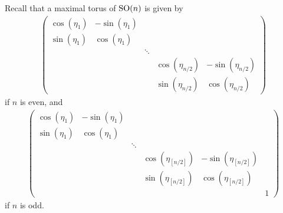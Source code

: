 \documentclass[pdftex]{sigma}
\numberwithin{equation}{section}
\begin{document}
Recall that a maximal torus of ${\rm SO}(n)$ is given by
\begin{gather*}
 \left(
\begin{matrix}
\cos(\eta_1) & -\sin(\eta_1) & & & \\
\sin(\eta_1) & \cos(\eta_1) & & & \\
 & & \ddots & & \\
 & & & \cos(\eta_{n/2}) & -\sin(\eta_{n/2}) \\
 & & & \sin(\eta_{n/2}) & \cos(\eta_{n/2})
\end{matrix}
\right)
\end{gather*}
if $n$ is even, and
\begin{gather*}
 \left(
\begin{matrix}
\cos(\eta_1) & -\sin(\eta_1) & & & & \\
\sin(\eta_1) & \cos(\eta_1) & & & & \\
 & & \ddots & & &\\
 & & & \cos(\eta_{[n/2]}) & -\sin(\eta_{[n/2]}) & \\
 & & & \sin(\eta_{[n/2]}) & \cos(\eta_{[n/2]}) & \\
 & & & & & 1
\end{matrix}
\right)
\end{gather*}
if $n$ is odd.
\end{document}
